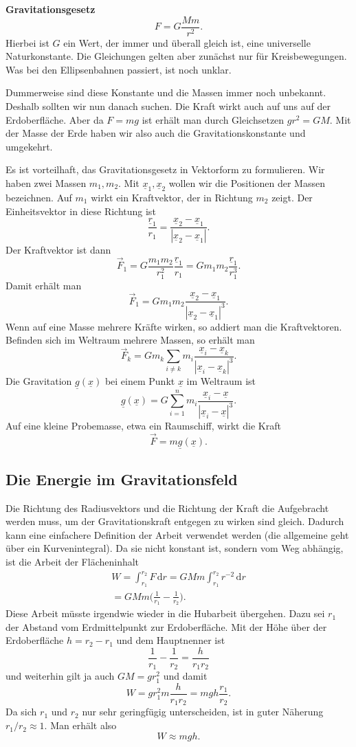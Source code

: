 \documentclass[a4paper,10pt,fleqn,twocolumn,twoside]{article}
\begin{document}
\textbf{Gravitationsgesetz}
\[F = G \frac{Mm}{r^2}.\]
Hierbei ist \(G\) ein Wert, der immer und überall gleich ist, eine
universelle Naturkonstante. Die Gleichungen gelten aber zunächst
nur für Kreisbewegungen. Was bei den Ellipsenbahnen passiert,
ist noch unklar.

Dummerweise sind diese Konstante und die Massen immer noch unbekannt.
Deshalb sollten wir nun danach suchen. Die Kraft wirkt auch auf
uns auf der Erdoberfläche. Aber da \(F=mg\) ist erhält man durch
Gleichsetzen \(gr^2=GM\). Mit der Masse der Erde haben wir also auch
die Gravitationskonstante und umgekehrt.

Es ist vorteilhaft, das Gravitationsgesetz in Vektorform zu
formulieren. Wir haben zwei Massen \(m_1, m_2\).
Mit \(\underline x_1, \underline x_2\) wollen wir die Positionen
der Massen bezeichnen. Auf \(m_1\) wirkt ein Kraftvektor, der in
Richtung \(m_2\) zeigt. Der Einheitsvektor in diese Richtung ist
\[\frac{\underline r_1}{r_1} = \frac{\underline x_2-\underline x_1}
{|\underline x_2-\underline x_1|}.\]
Der Kraftvektor ist dann
\[\vec F_1 = G \frac{m_1m_2}{r_1^2}\frac{\underline r_1}{r_1}
= Gm_1m_2\frac{\underline r_1}{r_1^3}.\]
Damit erhält man
\[\vec F_1 = Gm_1m_2\frac{\underline x_2-\underline x_1}
{|\underline x_2-\underline x_1|^3}.\]
Wenn auf eine Masse mehrere Kräfte wirken, so addiert man die
Kraftvektoren. Befinden sich im Weltraum mehrere Massen,
so erhält man
\[\vec F_k = Gm_k\sum_{i\ne k}m_i\frac{\underline x_i-\underline x_k}
{|\underline x_i-\underline x_k|^3}.\]
Die Gravitation \(\underline g(\underline x)\) bei einem
Punkt \(\underline x\) im Weltraum ist
\[\underline g(\underline x)
= G\sum_{i=1}^n m_i\frac{\underline x_i-\underline x}
{|\underline x_i-\underline x|^3}.\]
Auf eine kleine Probemasse, etwa ein Raumschiff, wirkt die Kraft
\[\vec F = m\underline g(\underline x).\]

\subsection{Die Energie im Gravitationsfeld}

Die Richtung des Radiusvektors und die Richtung der Kraft die
Aufgebracht werden muss, um der Gravitationskraft entgegen zu wirken
sind gleich. Dadurch kann eine einfachere Definition der Arbeit
verwendet werden (die allgemeine geht über ein Kurvenintegral). Da
sie nicht konstant ist, sondern vom Weg abhängig, ist die Arbeit der
Flächeninhalt
\begin{gather*}
W = \int_{r_1}^{r_2} F\,\mathrm dr
= GMm\int_{r_1}^{r_2} r^{-2}\,\mathrm dr\\
= GMm\Big(\frac{1}{r_1}-\frac{1}{r_2}\Big).
\end{gather*}
Diese Arbeit müsste irgendwie wieder in die Hubarbeit übergehen.
Dazu sei \(r_1\) der Abstand vom Erdmittelpunkt zur Erdoberfläche.
Mit der Höhe über der Erdoberfläche \(h=r_2-r_1\)
und dem Hauptnenner ist
\[\frac{1}{r_1}-\frac{1}{r_2} = \frac{h}{r_1r_2}\]
und weiterhin gilt ja auch \(GM=gr_1^2\) und damit
\[W = g{r_1^2}m \frac{h}{r_1r_2} = mgh\frac{r_1}{r_2}.\]
Da sich \(r_1\) und \(r_2\) nur sehr geringfügig unterscheiden,
ist in guter Näherung \(r_1/r_2\approx 1\). Man erhält also
\[W \approx mgh.\]
\end{document}
